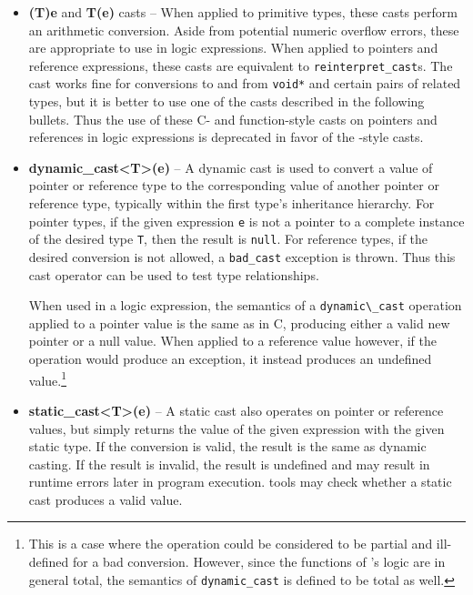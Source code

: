 \begin{itemize}
	\item \textbf{(T)e} and \textbf{T(e)} casts -- When applied to primitive types, these casts perform an arithmetic conversion. Aside from potential numeric overflow errors, these are appropriate to use in logic expressions. When applied to pointers and reference expressions, these casts are equivalent to
	\lstinline|reinterpret_cast|s. The cast works fine for conversions to and from \lstinline|void*| and certain pairs of related types, but it is better to use one of
	the \lang{} casts described in the following bullets.
	Thus the use of these C- and function-style casts on 
	pointers and references in logic expressions is 
	deprecated in favor of the \lang{}-style casts.
	
	\item \textbf{dynamic\_cast<T>(e)} -- A dynamic cast is used to convert a value of pointer or reference type to the corresponding value of another pointer or reference type, typically within the first type's inheritance hierarchy. For pointer types, if the given expression \lstinline|e| is not a pointer to a complete instance of the desired type \lstinline|T|, then the result is \lstinline|null|. For reference types, if the desired conversion is not allowed, a \lstinline|bad_cast| exception is thrown. Thus this cast operator can be used to test type relationships.
	
	When used in a logic expression, the semantics of a \lstinline|dynamic\_cast| operation applied to a pointer value is the same as in C, producing either a valid new pointer or a null value. When applied to a reference value however, if the operation would produce an exception, it instead produces an undefined value.\footnote{This is a case where the operation could be considered to be partial and ill-defined for a bad conversion. However, since the  functions of \NAME{}'s logic are in general total, the semantics of \lstinline|dynamic_cast| is defined to be total as well.}  
	
	\item \textbf{static\_cast<T>(e)} -- A static cast also operates on pointer or reference values, but simply returns the value of the given expression with the given static type. If the conversion is valid, the result is the same as dynamic casting. If the result is invalid, the result is undefined and may result in runtime errors later in program execution. \NAME{} tools may check whether a static cast produces a valid value.
	

\end{itemize}

